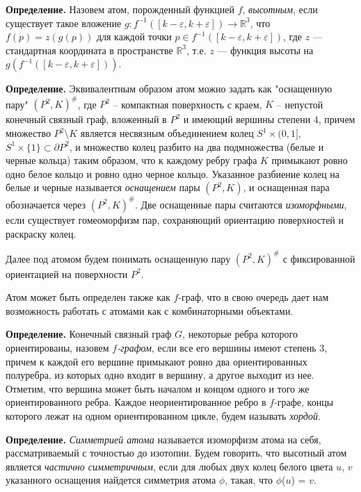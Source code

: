 \textbf{Определение. }
	Назовем атом, порожденный функцией $f$, {\em высотным}, если существует такое вложение $g
	\colon f^{-1}([k-\varepsilon, k+\varepsilon ]) \to \mathbb{R}^3$, что $f(p) = z(g(p))$ для каждой точки $p \in f^{-1}([k-\varepsilon, k+\varepsilon ])$, где $z$
	--- стандартная координата в пространстве $\mathbb R^3$, т.е. $z$ --- функция высоты на $g(f^{-1}([k-\varepsilon, k+\varepsilon ]))$.
	
			


\textbf{Определение.} Эквивалентным образом атом можно задать как "оснащенную пару"  $(P^2, K)^\#$, где $P^2$ -- компактная 	 поверхность с краем, $K$ -- непустой конечный связный граф, вложенный в $P^2$ и имеющий вершины		степени  $4$, причем множество $P^2 \setminus K$ является несвязным		объединением колец $S^1 \times (0, 1]$, $ S^1 \times \{1\} \subset\partial P^2$, и  множество колец разбито на два подмножества (белые и черные кольца) таким образом, что 	к каждому ребру графа $K$ примыкают ровно одно белое кольцо и ровно одно черное кольцо. 	Указанное разбиение колец  на белые и черные называется {\em 	оснащением} пары $(P^2, K)$, и оснащенная пара обозначается через $(P^2, K)^\#$.	Две  оснащенные пары считаются {\em изоморфными}, если существует	 гомеоморфизм  пар, сохраняющий ориентацию поверхностей  и раскраску колец.


Далее под атомом будем понимать оснащенную пару $(P^2, K)^\#$ с фиксированной ориентацией на поверхности $P^2$.



Атом может быть определен также как $f$-граф, что в свою очередь дает нам возможность работать с атомами как с комбинаторными объектами.



\textbf{Определение.} %
Конечный связный граф $G$, некоторые ребра которого ориентированы, назовем {\em
 $f$-графом}, если все его вершины имеют степень $3$, причем к каждой его
вершине примыкают ровно два ориентированных полуребра, из которых одно входит в вершину,
а другое выходит из нее. Отметим, что вершина может быть началом и концом одного и того
же ориентированного ребра. Каждое неориентированное ребро в $f$-графе, концы которого лежат на одном ориентированном цикле,  будем называть { \em хордой}.



{\bf Определение.}
	{\em Симметрией атома}  называется изоморфизм  атома на себя, рассматриваемый с точностью до изотопии. Будем говорить, что  высотный атом   является {\em частично симметричным}, если для любых двух колец белого  цвета $u$, $v$ указанного оснащения найдется симметрия атома $\phi $, такая, что  $\phi$($u$) = $v$.
	
